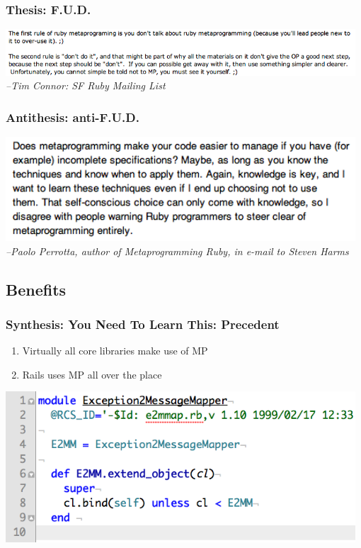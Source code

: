 \documentclass[slidestop,compress,mathserif]{beamer}
\begin{document}
\begin{frame}
	\frametitle{Thesis:  F.U.D.}
		\includegraphics[width=0.98\textwidth, height=0.25\textheight]{img/tim_hates_mp.png}		
		\vskip 0.5cm
		\emph{--Tim Connor:  SF Ruby Mailing List}
\end{frame}

\begin{frame}
	\frametitle{Antithesis:  anti-F.U.D.}
	\includegraphics[width=0.98\textwidth, height=0.45\textheight]{img/paolo_anti_fud.png}		
	\vskip 0.5cm
	\emph{--Paolo Perrotta, author of Metaprogramming Ruby, in e-mail to Steven Harms}
\end{frame}

\subsection{Benefits} %
\label{sub:benefits}

\begin{frame}
	\frametitle{Synthesis:  You Need To Learn This:  Precedent}
	\begin{enumerate}
		\item Virtually all core libraries make use of MP
		\item Rails uses MP all over the place
	\end{enumerate}
	\includegraphics[scale=0.45, width=0.98\textwidth]{img/e2mmap.png}
\end{frame}
\end{document}

